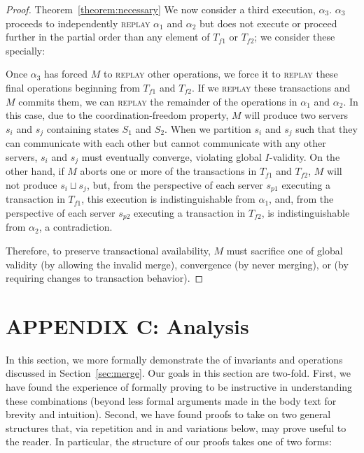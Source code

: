 \begin{proof}{Theorem~\ref{theorem:necessary}}
We now consider a third execution, $\alpha_3$. $\alpha_3$ proceeds to independently \textsc{replay} $\alpha_1$ and $\alpha_2$ but does not execute or proceed further in the partial order than any element of $T_{f1}$ or $T_{f2}$; we consider these specially:

Once $\alpha_3$ has forced $M$ to \textsc{replay} other operations, we force it to \textsc{replay} these final operations beginning from $T_{f1}$ and $T_{f2}$. If we \textsc{replay} these transactions and $M$ commits them, we can \textsc{replay} the remainder of the operations in $\alpha_1$ and $\alpha_2$. In this case, due to the coordination-freedom property, $M$ will produce two servers $s_i$ and $s_j$ containing states $S_1$ and $S_2$. When we partition $s_i$ and $s_j$ such that they can communicate with each other but cannot communicate with any other servers, $s_i$ and $s_j$ must eventually converge, violating global $I$-validity. On the other hand, if $M$ aborts one or more of the transactions in $T_{f1}$ and $T_{f2}$, $M$ will not produce $s_i \sqcup s_j$, but, from the perspective of each server $s_{p1}$ executing a transaction in $T_{f1}$, this execution is indistinguishable from $\alpha_1$, and, from the perspective of each server $s_{p2}$ executing a transaction in $T_{f2}$, is indistinguishable from $\alpha_2$, a contradiction.

Therefore, to preserve transactional availability, $M$ must sacrifice one of global validity (by allowing the invalid merge), convergence (by never   merging), or \cfreedom (by requiring changes to transaction behavior).
\end{proof}

\section*{APPENDIX C: \iconfluence Analysis}

In this section, we more formally demonstrate the \iconfluence of invariants and operations discussed in Section~\ref{sec:merge}. Our goals in this section are two-fold. First, we have found the experience of formally proving \iconfluence to be instructive in understanding these combinations (beyond less formal arguments made in the body text for brevity and intuition). Second, we have found \iconfluence proofs to take on two general structures that, via repetition and in and variations below, may prove useful to the reader. In particular, the structure of our \iconfluence proofs takes one of two forms:

